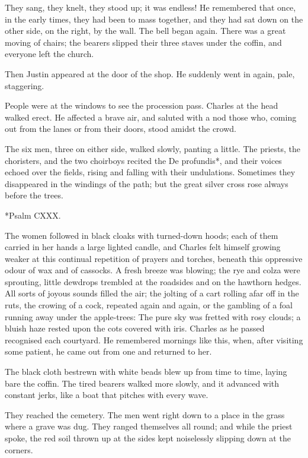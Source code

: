 \documentclass{tufte-book}
\begin{document}
They sang, they knelt, they stood up; it was endless! He remembered that
once, in the early times, they had been to mass together, and they had
sat down on the other side, on the right, by the wall. The bell began
again. There was a great moving of chairs; the bearers slipped their
three staves under the coffin, and everyone left the church.

Then Justin appeared at the door of the shop. He suddenly went in again,
pale, staggering.

People were at the windows to see the procession pass. Charles at the
head walked erect. He affected a brave air, and saluted with a nod those
who, coming out from the lanes or from their doors, stood amidst the
crowd.

The six men, three on either side, walked slowly, panting a little.
The priests, the choristers, and the two choirboys recited the De
profundis*, and their voices echoed over the fields, rising and falling
with their undulations. Sometimes they disappeared in the windings of
the path; but the great silver cross rose always before the trees.

     *Psalm CXXX.


The women followed in black cloaks with turned-down hoods; each of them
carried in her hands a large lighted candle, and Charles felt himself
growing weaker at this continual repetition of prayers and torches,
beneath this oppressive odour of wax and of cassocks. A fresh breeze was
blowing; the rye and colza were sprouting, little dewdrops trembled at
the roadsides and on the hawthorn hedges. All sorts of joyous sounds
filled the air; the jolting of a cart rolling afar off in the ruts, the
crowing of a cock, repeated again and again, or the gambling of a foal
running away under the apple-trees: The pure sky was fretted with rosy
clouds; a bluish haze rested upon the cots covered with iris. Charles as
he passed recognised each courtyard. He remembered mornings like this,
when, after visiting some patient, he came out from one and returned to
her.

The black cloth bestrewn with white beads blew up from time to time,
laying bare the coffin. The tired bearers walked more slowly, and it
advanced with constant jerks, like a boat that pitches with every wave.

They reached the cemetery. The men went right down to a place in the
grass where a grave was dug. They ranged themselves all round; and while
the priest spoke, the red soil thrown up at the sides kept noiselessly
slipping down at the corners.
\end{document}
